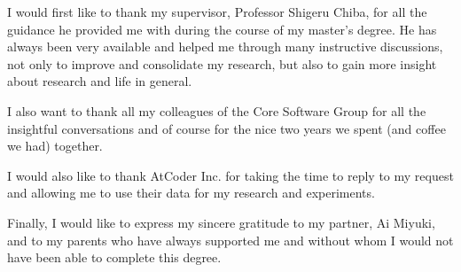 \begin{acknowledgements}
  I would first like to thank my supervisor, Professor Shigeru Chiba, for all
  the guidance he provided me with during the course of my master's degree. He
  has always been very available and helped me through many instructive
  discussions, not only to improve and consolidate my research, but also to
  gain more insight about research and life in general.

  I also want to thank all my colleagues of the Core Software Group for all the
  insightful conversations and of course for the nice two years we spent
  (and coffee we had) together.

  I would also like to thank AtCoder Inc. for taking the time to reply to my
  request and allowing me to use their data for my research and experiments.

  Finally, I would like to express my sincere gratitude to my partner, Ai
  Miyuki, and to my parents who have always supported me and without whom I
  would not have been able to complete this degree.
\end{acknowledgements}
